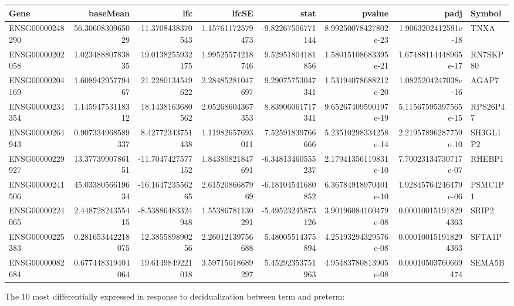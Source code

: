 \begin{center}
\begin{tabular}{lrrrrrrl}
Gene & baseMean & lfc & lfcSE & stat & pvalue & padj & Symbol\\
\hline
ENSG00000248290 & 56.3060830965029 & -11.3708438370543 & 1.15761172579473 & -9.82267506771144 & 8.99250078427802e-23 & 1.9063202412591e-18 & TNXA\\
ENSG00000202058 & 1.02348880783835 & 19.0138255932175 & 1.99525574218746 & 9.52951804181856 & 1.58015108683395e-21 & 1.67488114448965e-17 & RN7SKP80\\
ENSG00000204169 & 1.60894295779467 & 21.2280134549622 & 2.28485281047697 & 9.29075753047341 & 1.53194078688212e-20 & 1.0825204247038e-16 & AGAP7\\
ENSG00000234354 & 1.14594753118312 & 18.1438163680562 & 2.05268604367353 & 8.83906061717341 & 9.65267409590197e-19 & 5.11567595397565e-15 & RPS26P47\\
ENSG00000264943 & 0.907334968589337 & 8.42772343751438 & 1.11982657693011 & 7.52591839766666 & 5.23510298334258e-14 & 2.21957896287759e-10 & SH3GL1P2\\
ENSG00000229927 & 13.3773990786151 & -11.7047427577152 & 1.84380821847691 & -6.34813460555237 & 2.17941356119831e-10 & 7.70023134730717e-07 & RHEBP1\\
ENSG00000241506 & 45.0338056619634 & -16.164723556265 & 2.6152086687969 & -6.18104541680852 & 6.36784918970401e-10 & 1.92845764246479e-06 & PSMC1P1\\
ENSG00000224065 & 2.44872824355415 & -8.53886483324948 & 1.55386781130291 & -5.49523245873126 & 3.90196084160479e-08 & 0.000100151918294363 & SRIP2\\
ENSG00000225383 & 0.281653442218075 & 12.385589890256 & 2.26012139756688 & 5.48005514375894 & 4.25193294329576e-08 & 0.000100151918294363 & SFTA1P\\
ENSG00000082684 & 0.677448319404064 & 19.6149849221018 & 3.59715018689297 & 5.45292353751963 & 4.95483780813905e-08 & 0.00010503760669474 & SEMA5B\\
\end{tabular}
\end{center}


The 10 most differentially expressed in response to decidualization  between term and preterm:

